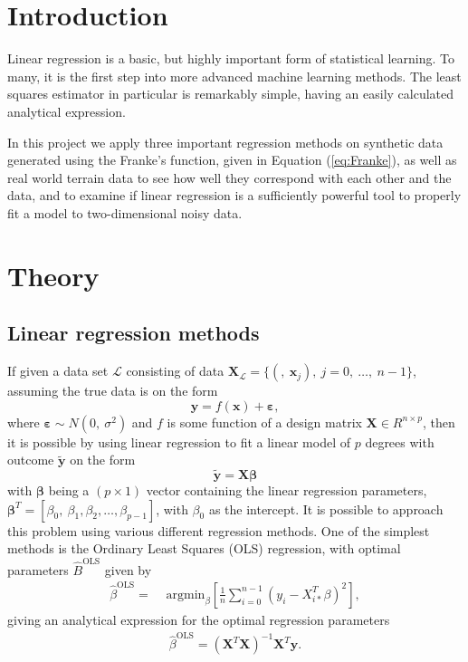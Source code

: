 \documentclass[a4paper, 10pt]{article}
\begin{document}
\begin{multicols}{2}
\section{Introduction}

Linear regression is a basic, but highly important form of statistical learning. To many, it is the first step into more advanced machine learning methods. The least squares estimator in particular is remarkably simple, having an easily calculated analytical expression.

In this project we apply three important regression methods on synthetic data generated using the Franke's function, given in Equation (\ref{eq:Franke}), as well as real world terrain data to see how well they correspond with each other and the data, and to examine if linear regression is a sufficiently powerful tool to properly fit a model to two-dimensional noisy data.


\section{Theory}
\subsection{Linear regression methods}
If given a data set $\mathcal{L}$ consisting of data $\bm{X}_\mathcal{L} = \{(	,\ \bm{x}_j),\ j=0,\ \dots,\ n-1\}$, assuming the true data is on the form
\begin{equation}
\bm{y} = f(\bm{x})+ \bm{\varepsilon} ,
\end{equation}
where $\bm{\varepsilon} \sim N(0,\ \sigma ^2)$ and $f$ is some function of a design matrix $\bm{X}\in R^{n\times p}$, then it is possible by using linear regression to fit a linear model of $p$ degrees with outcome $\bm{\tilde{y}}$ on the form
\begin{equation}
\bm{\tilde{y}} = \bm{X}\bm{\beta}
\end{equation}
with $\bm{\beta}$ being a $(p\times 1)$ vector containing the linear regression parameters, $\bm{\beta}^T=[\beta_0,\ \beta_1, \beta_2,\dots,\beta_{p-1}]$, with $\beta_0$ as the intercept.
It is possible to approach this problem using various different regression methods. One of the simplest methods is the Ordinary Least Squares (OLS) regression, with optimal  parameters $\hat{B}^\text{OLS}$ given by
\begin{align}
    \hat{\beta}^\text{OLS} =& \text{ argmin}_{ {\beta} } \left[ \frac{1}{n} \sum_{i=0}^{n-1} (y_i - X_{i*}^T \beta)^2 \right],
    \label{eq:argminbeta_OLS} 
\end{align}
giving an analytical expression for the optimal regression parameters
\begin{align}
    \hat{\beta}^{\text{OLS}} = (\bm{X}^T\bm{X})^{-1} \bm{X}^T \bm{y}.
    \label{eq:beta_OLS}
\end{align}


\end{multicols}
\end{document}

